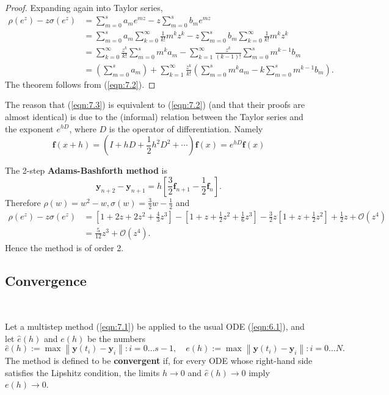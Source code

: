 \documentclass[a4paper]{article}
\begin{document}
\begin{proof}
    Expanding again into Taylor series,
\[
\begin{aligned}
\rho\left(e^z\right)-z \sigma\left(e^z\right) & =\sum_{m=0}^s a_m e^{m z}-z \sum_{m=0}^s b_m e^{m z}\\ 
&=\sum_{m=0}^s a_m \sum_{k=0}^{\infty} \frac{1}{k !} m^k z^k-z \sum_{m=0}^s b_m \sum_{k=0}^{\infty} \frac{1}{k !} m^k z^k \\
& =\sum_{k=0}^{\infty} \frac{z^k}{k !} \sum_{m=0}^s m^k a_m-\sum_{k=1}^{\infty} \frac{z^k}{(k-1) !} \sum_{m=0}^s m^{k-1} b_m \\
& =\left(\sum_{m=0}^s a_m\right)+\sum_{k=1}^{\infty} \frac{z^k}{k !}\left(\sum_{m=0}^s m^k a_m-k \sum_{m=0}^s m^{k-1} b_m\right) .
\end{aligned}
\]
The theorem follows from (\ref{eqn:7.2}).
\end{proof}
The reason that (\ref{eqn:7.3}) is equivalent to (\ref{eqn:7.2}) (and that their proofs are almost identical) is due to the (informal) relation between the Taylor series and the exponent $e^{h D}$, where $D$ is the operator of differentiation. Namely
\[
\mathbf{f}(x+h)=\left(I+h D+\frac{1}{2} h^2 D^2+\cdots\right) \mathbf{f}(x)=e^{h D} \mathbf{f}(x)
\]
\begin{example}\label{eg:7.5}
    The 2-step \textbf{Adams-Bashforth method} is
\begin{equation}\label{eqn:7.4}
    \mathbf{y}_{n+2}-\mathbf{y}_{n+1}=h\left[\frac{3}{2} \mathbf{f}_{n+1}-\frac{1}{2} \mathbf{f}_n\right] .
\end{equation}
Therefore $\rho(w)=w^2-w, \sigma(w)=\frac{3}{2} w-\frac{1}{2}$ and
\begin{align*}
    \rho\left(e^z\right)-z \sigma\left(e^z\right)&=\left[1+2 z+2 z^2+\frac{4}{3} z^3\right]-\left[1+z+\frac{1}{2} z^2+\frac{1}{6} z^3\right]-\frac{3}{2} z\left[1+z+\frac{1}{2} z^2\right]+\frac{1}{2} z+\mathcal{O}\left(z^4\right)\\ 
    &=\frac{5}{12} z^3+\mathcal{O}\left(z^4\right).
\end{align*}
Hence the method is of order 2.
\end{example}

\subsection{Convergence}
\ \vspace*{-1.5em}
\begin{definition}
    Let a multistep method (\ref{eqn:7.1}) be applied to the usual ODE (\ref{eqn:6.1}), and let $\widehat{e}(h)$ and $e(h)$ be the numbers
\[
\widehat{e}(h):=\max \left\|\mathbf{y}\left(t_i\right)-\mathbf{y}_i\right\|: i=0 \ldots s-1, \quad e(h):=\max \left\|\mathbf{y}\left(t_i\right)-\mathbf{y}_i\right\|: i=0 \ldots N .
\]
The method is defined to be \textbf{convergent} if, for every ODE whose right-hand side satisfies the Lipshitz condition, the limits $h \rightarrow 0$ and $\widehat{e}(h) \rightarrow 0$ imply $e(h) \rightarrow 0$.
\end{definition}
\end{document}
